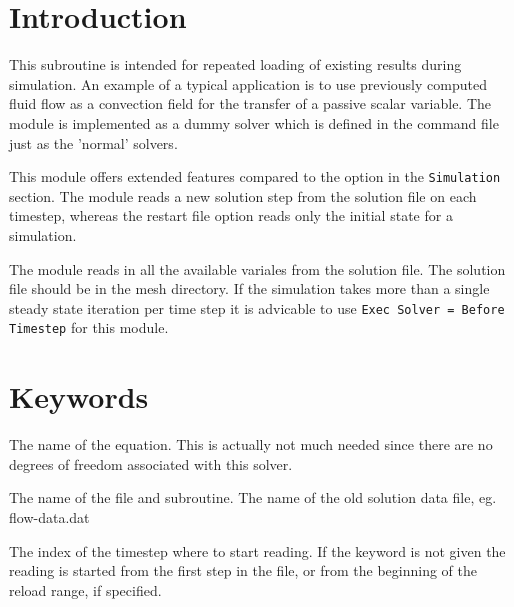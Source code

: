 
\noindent
{}
\begin{versiona}


\section{Introduction}

This subroutine is intended for repeated loading of existing results
during simulation. An example of a typical application is to use
previously computed fluid flow as a convection field for the transfer
of a passive scalar variable. The module is implemented as a dummy
solver which is defined in the command file just as the 'normal'
solvers.

This module offers extended features compared to the \texttt{} option in the \texttt{Simulation} section. The module reads a new
solution step from the solution file on each timestep, whereas the
restart file option reads only the initial state for a simulation.

The module reads in all the available variales from the solution
file. The solution file should be in the mesh directory. If the
simulation takes more than a single steady state iteration per time
step it is advicable to use \texttt{Exec Solver = Before Timestep} for
this module.


\section{Keywords}
\end{versiona}

\sifbegin
{}
\sifbegin
{}
The name of the equation. This is actually not much needed 
since there are no degrees of freedom associated with this solver.

The name of the file and subroutine. 
The name of the old solution data file, eg. flow-data.dat

The index of the timestep where to start reading. If the keyword is
not given the reading is started from the first step in the file, or
from the beginning of the reload range, if specified.

